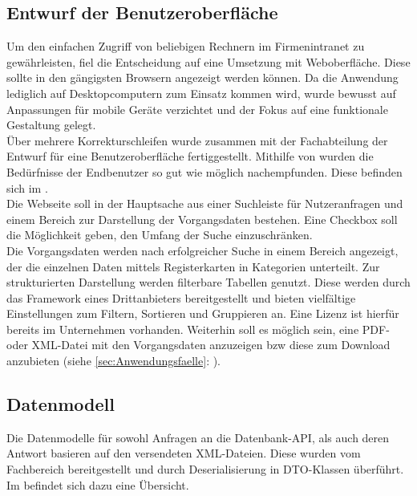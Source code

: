 \subsection{Entwurf der Benutzeroberfläche}
\label{sec:Benutzeroberflaeche} 
Um den einfachen Zugriff von beliebigen Rechnern im Firmenintranet zu gewährleisten,
fiel die Entscheidung auf eine Umsetzung mit Weboberfläche. Diese sollte in den gängigsten Browsern angezeigt werden können.
Da die Anwendung lediglich auf Desktopcomputern zum Einsatz kommen wird, wurde bewusst auf Anpassungen für mobile Geräte verzichtet
und der Fokus auf eine funktionale Gestaltung gelegt.\\
Über mehrere Korrekturschleifen wurde zusammen mit der Fachabteilung der Entwurf für eine Benutzeroberfläche
fertiggestellt. Mithilfe von  wurden die Bedürfnisse der Endbenutzer so gut wie möglich nachempfunden.
Diese befinden sich im .\\
Die Webseite soll in der Hauptsache aus einer Suchleiste für Nutzeranfragen und einem Bereich zur Darstellung der Vorgangsdaten
bestehen. Eine Checkbox soll die Möglichkeit geben, den Umfang der Suche einzuschränken.\\
Die Vorgangsdaten werden nach erfolgreicher Suche in einem Bereich angezeigt, der die einzelnen Daten mittels Registerkarten
in Kategorien unterteilt. Zur strukturierten Darstellung werden filterbare Tabellen genutzt. Diese werden durch das
Framework  eines Drittanbieters bereitgestellt und bieten vielfältige Einstellungen zum Filtern,
Sortieren und Gruppieren an. Eine Lizenz ist hierfür bereits im Unternehmen vorhanden.
Weiterhin soll es möglich sein, eine \acs{PDF}- oder \acs{XML}-Datei mit den Vorgangsdaten anzuzeigen \acs{bzw} diese zum 
Download anzubieten (siehe \ref{sec:Anwendungsfaelle}: ).

\subsection{Datenmodell}
\label{sec:Datenmodell}
Die Datenmodelle für sowohl Anfragen an die Datenbank-API, als auch deren Antwort basieren auf den versendeten XML-Dateien. 
Diese wurden vom Fachbereich bereitgestellt und durch Deserialisierung in \acs{DTO}-Klassen überführt.\\
Im  befindet sich dazu eine Übersicht. 

